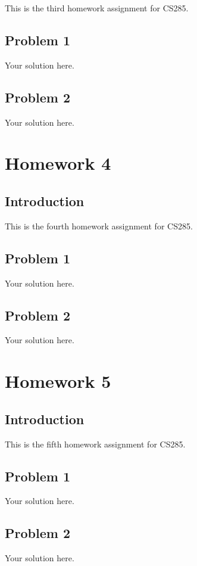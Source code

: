 \documentclass[12pt,oneside]{book}
\begin{document}
This is the third homework assignment for CS285.

\section{Problem 1}

Your solution here.

\section{Problem 2}

Your solution here.

\chapter{Homework 4}

\section{Introduction}

This is the fourth homework assignment for CS285.

\section{Problem 1}

Your solution here.

\section{Problem 2}

Your solution here.

\chapter{Homework 5}

\section{Introduction}

This is the fifth homework assignment for CS285.

\section{Problem 1}

Your solution here.

\section{Problem 2}

Your solution here.
\end{document}
